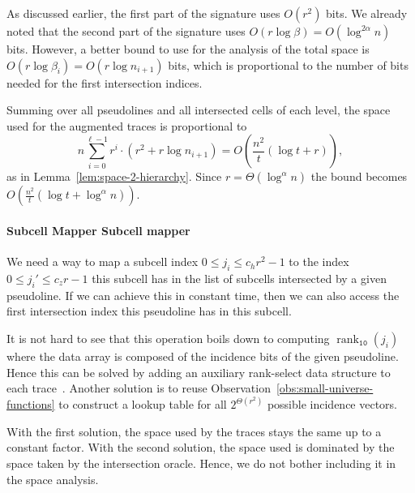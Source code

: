 As discussed earlier, the first part of the signature uses \(O(r^2)\) bits.
We already noted that the second part of the signature
uses \(O(r \log \beta) = O(\log^{2 \alpha} n)\) bits. However, a better bound
to use for the analysis of the total space is
\(O(r \log \beta_i) = O(r \log n_{i+1})\) bits, which is proportional to the
number of bits needed for the first intersection indices.

Summing over all pseudolines and all intersected cells of each level,
the space used for the augmented traces is proportional to
\begin{displaymath}
n \sum_{i=0}^{\ell-1} r^i \cdot \left( r^2 + r \log n_{i+1} \right)
=
O\left(\frac{n^2}{t} (\log t + r)\right),
\end{displaymath}
%
as in Lemma~\ref{lem:space-2-hierarchy}.
Since \(r = \Theta(\log^{\alpha} n)\) the bound becomes
\(O\left(\frac{n^2}{t} (\log t + \log^{\alpha} n)\right)\).


\paragraph*{\iftitlecase%
Subcell Mapper\else%
Subcell mapper\fi}

We need a way to map a subcell index \(0 \leq j_i \leq c_h r^2 - 1\) to the
index \(0 \leq j_i' \leq c_z r - 1\) this subcell has in the list of subcells
intersected by a given pseudoline. If we can achieve this in constant time,
then we can also access the first intersection index this pseudoline has in
this subcell.

It is not hard to see that this operation boils down to computing
\(\operatorname{rank}_{\texttt{10}}(j_i)\) where the data array is composed of
the incidence bits of the given pseudoline. Hence this can be solved by adding
an auxiliary rank-select data structure to each trace~\cite{RRS07,BH17}.
Another solution is to reuse Observation~\ref{obs:small-universe-functions} to
construct a lookup table for all \(2^{\Theta(r^2)}\) possible incidence
vectors.
%

With the first solution, the space used by the traces stays the same up to a
constant factor. With the second solution, the space used is dominated by the
space taken by the intersection oracle. Hence, we do not bother including it in
the space analysis.


